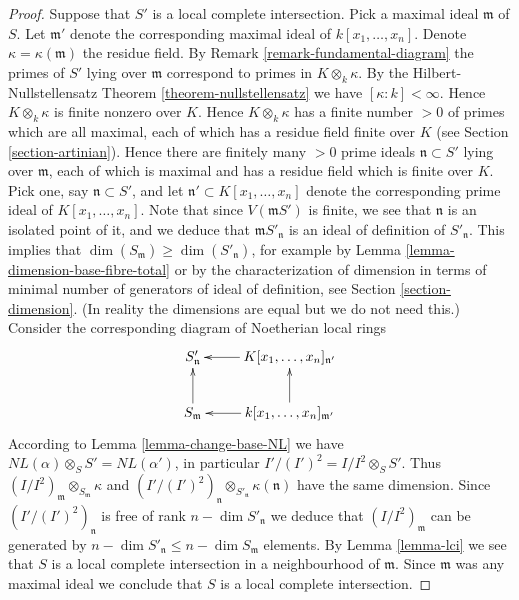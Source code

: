 \begin{proof}
\medskip\noindent
Suppose that $S'$ is a local complete intersection.
Pick a maximal ideal $\mathfrak m$ of $S$. Let $\mathfrak m'$
denote the corresponding maximal ideal of $k[x_1, \ldots, x_n]$.
Denote $\kappa = \kappa(\mathfrak m)$ the residue field.
By Remark \ref{remark-fundamental-diagram} the primes of
$S'$ lying over $\mathfrak m$ correspond to primes
in $K \otimes_k \kappa$. By the Hilbert-Nullstellensatz
Theorem \ref{theorem-nullstellensatz} we have $[\kappa : k] < \infty$.
Hence $K \otimes_k \kappa$ is finite nonzero over $K$.
Hence $K \otimes_k \kappa$ has a finite number $> 0$ of primes
which are all maximal, each of which has a residue field
finite over $K$ (see Section \ref{section-artinian}).
Hence there are finitely many $> 0$ prime ideals
$\mathfrak n \subset S'$ lying over $\mathfrak m$,
each of which is maximal and  has a residue field
which is finite over $K$. Pick one, say $\mathfrak n \subset S'$,
and let $\mathfrak n' \subset K[x_1, \ldots, x_n]$ denote the corresponding
prime ideal of $K[x_1, \ldots, x_n]$.
Note that since $V(\mathfrak mS')$ is finite, we see that
$\mathfrak n$ is an isolated point of it, and we
deduce that $\mathfrak mS'_{\mathfrak n}$ is an ideal of definition
of $S'_{\mathfrak n}$. This implies that $\dim(S_{\mathfrak m})
\geq \dim(S'_{\mathfrak n})$, for example by
Lemma \ref{lemma-dimension-base-fibre-total}
or by the characterization of dimension
in terms of minimal number of generators of ideal of definition,
see Section \ref{section-dimension}. (In reality the dimensions
are equal but we do not need this.)
Consider the corresponding diagram of Noetherian local rings
$$
\xymatrix{
S'_{\mathfrak n} &  K[x_1, \ldots, x_n]_{\mathfrak n'} \ar[l] \\
S_{\mathfrak m}\ar[u] &  k[x_1, \ldots, x_n]_{\mathfrak m'} \ar[u] \ar[l]
}
$$
According to Lemma \ref{lemma-change-base-NL} we have
$NL(\alpha) \otimes_S S' = NL(\alpha')$, in particular
$I'/(I')^2 = I/I^2 \otimes_S S'$. Thus
$(I/I^2)_{\mathfrak m} \otimes_{S_{\mathfrak m}} \kappa$
and
$(I'/(I')^2)_{\mathfrak n} \otimes_{S'_{\mathfrak n}} \kappa(\mathfrak n)$
have the same dimension. Since $(I'/(I')^2)_{\mathfrak n}$
is free of rank $n - \dim S'_{\mathfrak n}$ we deduce that
$(I/I^2)_{\mathfrak m}$ can be generated by
$n - \dim S'_{\mathfrak n} \leq n - \dim S_{\mathfrak m}$ elements.
By Lemma \ref{lemma-lci} we see that $S$ is a local
complete intersection in a neighbourhood of $\mathfrak m$.
Since $\mathfrak m$ was any maximal ideal we conclude that
$S$ is a local complete intersection.
\end{proof}







